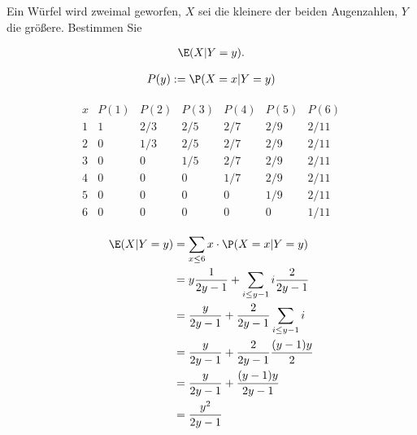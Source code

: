 
\begin{exercise}

Ein Würfel wird zweimal geworfen, $X$ sei die kleinere der beiden Augenzahlen, $Y$ die größere.
Bestimmen Sie

\begin{align*}
    \E(X | Y = y).
\end{align*}

\end{exercise}


\begin{solution}

\begin{align*}
    P(y) := \P(X = x | Y = y)
\end{align*}

\begin{align*}
    \begin{array}{c|c|c|c|c|c|c}
        x & P(1) & P(2) & P(3) & P(4) & P(5) & P(6) \\ \hline
        1 & 1    & 2/3  & 2/5  & 2/7  & 2/9  & 2/11 \\
        2 & 0    & 1/3  & 2/5  & 2/7  & 2/9  & 2/11 \\
        3 & 0    & 0    & 1/5  & 2/7  & 2/9  & 2/11 \\
        4 & 0    & 0    & 0    & 1/7  & 2/9  & 2/11 \\
        5 & 0    & 0    & 0    & 0    & 1/9  & 2/11 \\
        6 & 0    & 0    & 0    & 0    & 0    & 1/11
    \end{array}
\end{align*}

\begin{align*}
    \E(X | Y = y)
    & =
    \sum_{x \leq 6}
        x \cdot \P(X = x | Y = y) \\
    & =
    y \frac{1}{2 y - 1} + \sum_{i \leq y-1} i \frac{2}{2 y - 1} \\
    & =
    \frac{y}{2 y - 1} + \frac{2}{2 y - 1} \sum_{i \leq y-1} i \\
    & =
    \frac{y}{2 y - 1} + \frac{2}{2 y - 1} \frac{(y - 1) y}{2} \\
    & =
    \frac{y}{2 y - 1} + \frac{(y - 1) y}{2 y - 1} \\
    & =
    \frac{y^2}{2 y - 1}
\end{align*}

\end{solution}

